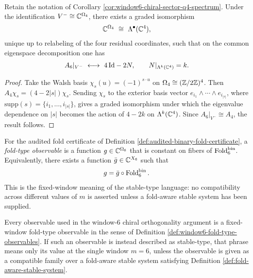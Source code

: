 \begin{proposition}\label{prop:window6-chiral-exterior-algebra-degree-operator}
Retain the notation of Corollary \ref{cor:window6-chiral-sector-q4-spectrum}.
Under the identification \(V^-\cong \mathbb{C}^{\Omega_4}\), there exists a graded isomorphism
\[
\CC^{\Omega_4}\ \cong\ \Lambda^\bullet(\CC^4),
\]
unique up to relabeling of the four residual coordinates, such that on the common eigenspace decomposition one has
\[
A_6|_{V^-}\ \longleftrightarrow\ 4\,\mathrm{Id}-2N,
\qquad
N|_{\Lambda^k(\CC^4)}=k.
\]
\end{proposition}
\begin{proof}
Take the Walsh basis \(\chi_s(u)=(-1)^{s\cdot u}\) on \(\Omega_4\cong(\mathbb{Z}/2\mathbb{Z})^4\).
Then \(A_4\chi_s=(4-2|s|)\chi_s\).
Sending \(\chi_s\) to the exterior basis vector \(e_{i_1}\wedge\cdots\wedge e_{i_{|s|}}\), where \(\mathrm{supp}(s)=\{i_1,\dots,i_{|s|}\}\), gives a graded isomorphism under which the eigenvalue dependence on \(|s|\) becomes the action of \(4-2k\) on \(\Lambda^k(\mathbb{C}^4)\).
Since \(A_6|_{V^-}\cong A_4\), the result follows. \qedhere
\end{proof}

\begin{definition}\label{def:window6-fold-type-observables}
For the audited fold certificate of Definition \ref{def:audited-binary-fold-certificate}, a \emph{fold-type observable} is a function \(g\in\mathbb{C}^{\Omega_6}\) that is constant on fibers of \(\operatorname{Fold}_6^{\mathrm{bin}}\).  Equivalently, there exists a function \(\bar g\in\mathbb{C}^{X_6}\) such that
\[
g=\bar g\circ \operatorname{Fold}_6^{\mathrm{bin}}.
\]
This is the fixed-window meaning of the stable-type language: no compatibility across different values of \(m\) is asserted unless a fold-aware stable system has been supplied.
\end{definition}

\begin{lemma}\label{lem:window6-fold-type-fixed-window-interface}
Every observable used in the window-\(6\) chiral orthogonality argument is a fixed-window fold-type observable in the sense of Definition \ref{def:window6-fold-type-observables}.  If such an observable is instead described as stable-type, that phrase means only its value at the single window \(m=6\), unless the observable is given as a compatible family over a fold-aware stable system satisfying Definition \ref{def:fold-aware-stable-system}.
\end{lemma}

